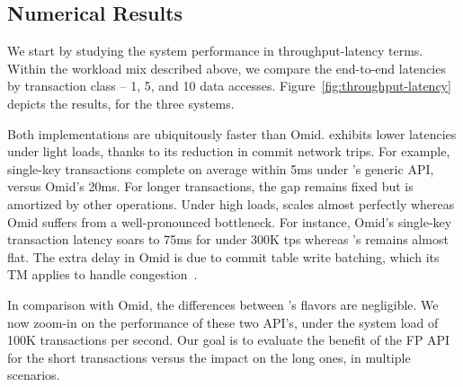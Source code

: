 \subsection{Numerical Results} 
We start by studying the system performance in throughput-latency terms. 
Within the workload mix described above, we compare the end-to-end latencies by transaction class -- 
1, 5, and 10 data accesses. Figure~\ref{fig:throughput-latency} depicts the results, for the three systems. 

Both {\sys\/} implementations are ubiquitously faster than Omid. {\sys\/} exhibits lower latencies under light loads, 
thanks to its reduction in commit network trips. For example, single-key transactions complete on average within 
5ms under {\sys}'s generic API, versus Omid's 20ms. For longer transactions, the gap remains fixed but is amortized 
by other operations. Under high loads, {\sys\/} scales almost perfectly whereas Omid suffers from a well-pronounced 
bottleneck. For instance, Omid's single-key transaction latency soars to 75ms for under 300K tps whereas
{\sys}'s remains almost flat. The extra delay in Omid is due to commit table write batching, which its TM applies 
to handle congestion~\cite{Omid2017}. 

In comparison with Omid, the differences between {\sys}'s flavors are negligible. We now zoom-in on the performance 
of these two API's, under the system load of 100K transactions per second. Our goal is to evaluate the benefit of the FP
API for the short transactions versus the impact on the long ones, in multiple scenarios. 






